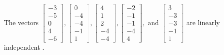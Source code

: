 \begin{exercise}
\begin{exerciseStatement}
  \end{exerciseStatement}
  \begin{exerciseAnswer}
   The vectors \(\left[\begin{array}{r}
-3 \\
-5 \\
0 \\
4 \\
-6
\end{array}\right] , \left[\begin{array}{r}
0 \\
-4 \\
-4 \\
-1 \\
1
\end{array}\right] , \left[\begin{array}{r}
4 \\
1 \\
2 \\
-4 \\
-4
\end{array}\right] , \left[\begin{array}{r}
-2 \\
-1 \\
-1 \\
-4 \\
4
\end{array}\right] , \text{ and } \left[\begin{array}{r}
3 \\
-3 \\
-3 \\
-1 \\
1
\end{array}\right]\) are 
  	 linearly independent  .
  


  \end{exerciseAnswer}
\end{exercise}